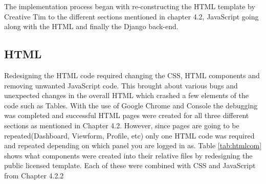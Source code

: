 \documentclass[../main.tex]{subfiles}
\begin{document}
\raggedright
The implementation process began with re-constructing the HTML template by Creative Tim\cite{creativeTimTemplate} to the different sections mentioned in chapter 4.2, JavaScript going along with the HTML and finally the Django back-end.

\subsection{HTML}
Redesigning the HTML code required changing the CSS, HTML components and removing unwanted JavaScript code. This brought about various bugs and unexpected changes in the overall HTML which crashed a few elements of the code such as Tables. With the use of Google Chrome and Console the debugging was completed and successful HTML pages were created for all three different sections as mentioned in Chapter 4.2. However, since pages are going to be repeated(Dashboard, Viewform, Profile, etc) only one HTML code was required and repeated depending on which panel you are logged in as. Table \ref{tab:htmlcom} shows what components were created into their relative files by redesigning the public licensed template. Each of these were combined with CSS and JavaScript from Chapter 4.2.2

\bgroup
\def\arraystretch{2}%
\begin{table}[H]
\centering
\centering
{}
\label{tab:htmlcom} 
\end{table}
\egroup
\end{document}
